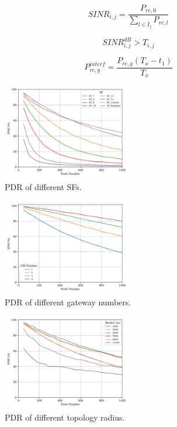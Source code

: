 \documentclass[conference]{IEEEtran}
\begin{document}
\begin{equation} \label{eq:sinr_db}
SINR_{i,j} = \dfrac{P_{rc,0}}{\sum_{l \in I_j} P_{rc,l}}
\end{equation}

\begin{equation} \label{eq:sinr_t}
SINR_{i,j}^{dB} > T_{i,j}
\end{equation}

\begin{equation} \label{eq:p_interference}
P_{rc,y}^{interf} = \dfrac{P_{rc,y}(T_{x}-t_{1})}{T_{x}}
\end{equation}

\begin{figure}
\centering
\includegraphics[width=0.5\textwidth]{sf_pdr}
\caption{PDR of different SFs.}
\label{fig:sf_pdr}
\end{figure}

\begin{figure}
\centering
\includegraphics[width=0.5\textwidth]{gw_pdr}
\caption{PDR of different gateway numbers.}
\label{fig:gw_pdr}
\end{figure}

\begin{figure}
\centering
\includegraphics[width=0.5\textwidth]{r_pdr}
\caption{PDR of different topology radius.}
\label{fig:r_pdr}
\end{figure}
\end{document}
